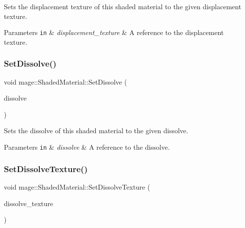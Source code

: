 Sets the displacement texture of this shaded material to the given displacement texture.


\begin{DoxyParams}[1]{Parameters}
\mbox{\tt in}  & {\em displacement\+\_\+texture} & A reference to the displacement texture. \\
\hline
\end{DoxyParams}
\hypertarget{structmage_1_1_shaded_material_a403f3e4e673d31fffdb387f518393453}{}\label{structmage_1_1_shaded_material_a403f3e4e673d31fffdb387f518393453} 
\subsubsection{\texorpdfstring{Set\+Dissolve()}{SetDissolve()}}
{\footnotesize\ttfamily void mage\+::\+Shaded\+Material\+::\+Set\+Dissolve (\begin{DoxyParamCaption}\item[{float}]{dissolve }\end{DoxyParamCaption})\hspace{0.3cm}{\ttfamily [noexcept]}}

Sets the dissolve of this shaded material to the given dissolve.


\begin{DoxyParams}[1]{Parameters}
\mbox{\tt in}  & {\em dissolve} & A reference to the dissolve. \\
\hline
\end{DoxyParams}
\hypertarget{structmage_1_1_shaded_material_ab7f2f36caddb8bbdde8753424968c231}{}\label{structmage_1_1_shaded_material_ab7f2f36caddb8bbdde8753424968c231} 
\subsubsection{\texorpdfstring{Set\+Dissolve\+Texture()}{SetDissolveTexture()}}
{\footnotesize\ttfamily void mage\+::\+Shaded\+Material\+::\+Set\+Dissolve\+Texture (\begin{DoxyParamCaption}\item[{\hyperlink{namespacemage_a1e01ae66713838a7a67d30e44c67703e}{Shared\+Ptr}$<$ \hyperlink{classmage_1_1_texture}{Texture} $>$}]{dissolve\+\_\+texture }\end{DoxyParamCaption})}

